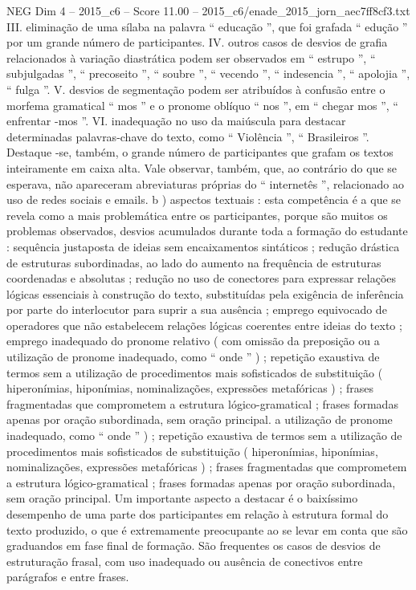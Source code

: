 \begin{textsample}{NEG Dim 4 – 2015\_c6 – Score 11.00 – 2015\_c6/enade\_2015\_jorn\_aec7ff8cf3.txt}
III. eliminação de uma sílaba na palavra “ educação ”, que foi grafada “ edução ” por um grande número de participantes.
IV. outros casos de desvios de grafia relacionados à variação diastrática podem ser observados em “ estrupo ”, “ subjulgadas ”, “ precoseito ”, “ soubre ”, “ vecendo ”, “ indesencia ”, “ apolojia ”, “ fulga ”.
V. desvios de segmentação podem ser atribuídos à confusão entre o morfema gramatical “ mos ” e o pronome oblíquo “ nos ”, em “ chegar mos ”, “ enfrentar -mos ”.
VI. inadequação no uso da maiúscula para destacar determinadas palavras-chave do texto, como “ Violência ”, “ Brasileiros ”.
Destaque -se, também, o grande número de participantes que grafam os textos inteiramente em caixa alta.
Vale observar, também, que, ao contrário do que se esperava, não apareceram abreviaturas próprias do “ internetês ”, relacionado ao uso de redes sociais e emails. b ) aspectos textuais : esta competência é a que se revela como a mais problemática entre os participantes, porque são muitos os problemas observados, desvios acumulados durante toda a formação do estudante : sequência justaposta de ideias sem encaixamentos sintáticos ; redução drástica de estruturas subordinadas, ao lado do aumento na frequência de estruturas coordenadas e absolutas ; redução no uso de conectores para expressar relações lógicas essenciais à construção do texto, substituídas pela exigência de inferência por parte do interlocutor para suprir a sua ausência ; emprego equivocado de operadores que não estabelecem relações lógicas coerentes entre ideias do texto ; emprego inadequado do pronome relativo ( com omissão da preposição ou a utilização de pronome inadequado, como “ onde ” ) ; repetição exaustiva de termos sem a utilização de procedimentos mais sofisticados de substituição ( hiperonímias, hiponímias, nominalizações, expressões metafóricas ) ; frases fragmentadas que comprometem a estrutura lógico-gramatical ; frases formadas apenas por oração subordinada, sem oração principal. a utilização de pronome inadequado, como “ onde ” ) ; repetição exaustiva de termos sem a utilização de procedimentos mais sofisticados de substituição ( hiperonímias, hiponímias, nominalizações, expressões metafóricas ) ; frases fragmentadas que comprometem a estrutura lógico-gramatical ; frases formadas apenas por oração subordinada, sem oração principal.
Um importante aspecto a destacar é o baixíssimo desempenho de uma parte dos participantes em relação à estrutura formal do texto produzido, o que é extremamente preocupante ao se levar em conta que são graduandos em fase final de formação.
São frequentes os casos de desvios de estruturação frasal, com uso inadequado ou ausência de conectivos entre parágrafos e entre frases.

\end{textsample}
